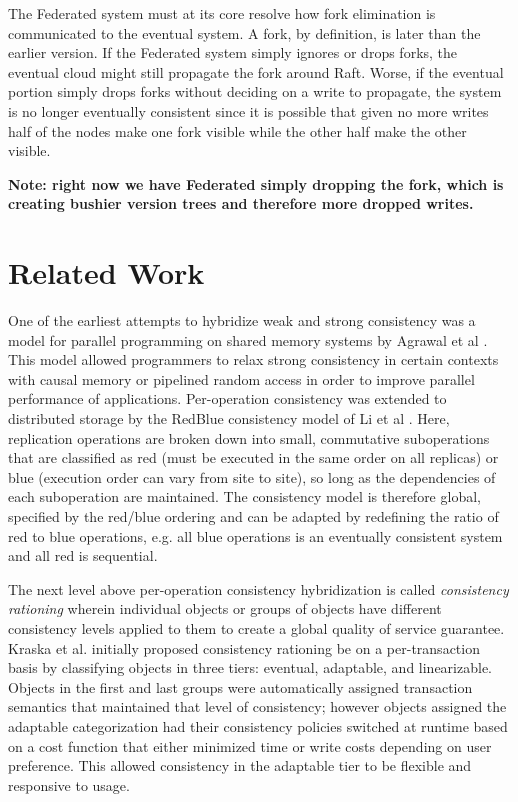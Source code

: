 \documentclass[10pt,conference,compsocconf,letterpaper]{IEEEtran}
\begin{document}
The Federated system must at its core resolve how fork elimination is communicated to the eventual system. A fork, by definition, is later than the earlier version. If the Federated system simply ignores or drops forks, the eventual cloud might still propagate the fork around Raft. Worse, if the eventual portion simply drops forks without deciding on a write to propagate, the system is no longer eventually consistent since it is possible that given no more writes half of the nodes make one fork visible while the other half make the other visible.

\textbf{Note: right now we have Federated simply dropping the fork, which is creating bushier version trees and therefore more dropped writes.}

\section{Related Work}

One of the earliest attempts to hybridize weak and strong consistency was a model for parallel programming on shared memory systems by Agrawal et al \cite{agrawal_mixed_1994}. This model allowed programmers to relax strong consistency in certain contexts with causal memory or pipelined random access in order to improve parallel performance of applications. Per-operation consistency was extended to distributed storage by the RedBlue consistency model of Li et al \cite{li_making_2012}. Here, replication operations are broken down into small, commutative suboperations that are classified as red (must be executed in the same order on all replicas) or blue (execution order can vary from site to site), so long as the dependencies of each suboperation are maintained. The consistency model is therefore global, specified by the red/blue ordering and can be adapted by redefining the ratio of red to blue operations, e.g. all blue operations is an eventually consistent system and all red is sequential.

The next level above per-operation consistency hybridization is called \textit{consistency rationing} wherein individual objects or groups of objects have different consistency levels applied to them to create a global quality of service guarantee. Kraska et al. \cite{kraska_consistency_2009} initially proposed consistency rationing be on a per-transaction basis by classifying objects in three tiers: eventual, adaptable, and linearizable. Objects in the first and last groups were automatically assigned transaction semantics that maintained that level of consistency; however objects assigned the adaptable categorization had their consistency policies switched at runtime based on a cost function that either minimized time or write costs depending on user preference. This allowed consistency in the adaptable tier to be flexible and responsive to usage.
\end{document}
